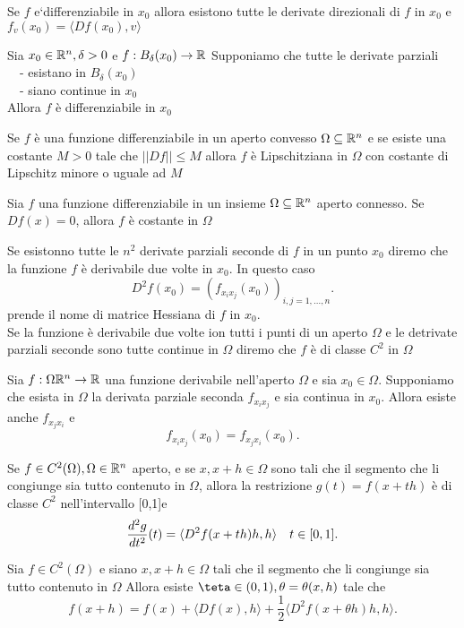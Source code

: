 \documentclass[12px]{article}
\begin{document}
	\begin{teo}
		Se $f$ e`differenziabile in $x_0$ allora esistono tutte le derivate direzionali di $f$ in $x_0$ e $f_v(x_0) = \langle Df(x_0), v \rangle $
	\end{teo}
	\begin{teo}
		Sia $x_0\in \mathbb{R}^n,\delta>0$ e $f:B_{\delta}(x_0) \rightarrow\mathbb{R}$ Supponiamo che tutte le derivate parziali\\
		\text{} \ \ - esistano in $B_\delta(x_0)$ \\
		\text{}	\ \ - siano continue in $x_0$\\
Allora $f$ è differenziabile in $x_0$
	\end{teo}
	\begin{prop}
		Se $f$ è una funzione differenziabile in un aperto convesso $\Omega\subseteq\mathbb{R}^n$ e se esiste una costante  $M>0$ tale che  $||Df||\leq M$ allora  $f$ è Lipschitziana in $\Omega$ con costante di Lipschitz minore o uguale ad $M$
	\end{prop}
	\begin{prop}
		Sia $f$ una funzione differenziabile in un insieme $\Omega\subseteq\mathbb{R}^n$ aperto connesso. Se $Df(x) = 0$, allora $f$ è costante in $\Omega$
	\end{prop}
	\newpage
	\begin{defi}
		Se esistonno tutte le $n^2$ derivate parziali seconde di  $f$ in un punto $x_0$ diremo che la funzione $f$ è derivabile due volte in $x_0$. In questo caso
		\[
			D^2f(x_0) = (f_{x_ix_j}(x_0))_{i,j=1,\ldots,n}
		.\] 
		prende il nome di matrice Hessiana di $f$ in $x_0$.\\
		Se la funzione è derivabile due volte ion tutti i punti di un aperto $\Omega$ e le detrivate parziali seconde sono tutte continue in $\Omega$ diremo che $f$ è di classe $C^2$ in  $\Omega$
	\end{defi}
	\begin{teo}[Schwarz]
		Sia $f:\Omega\mathbb{R}^n \rightarrow \mathbb{R}$ una funzione derivabile nell'aperto $\Omega$ e sia $x_0\in\Omega$. Supponiamo che esista in $\Omega$ la derivata parziale seconda $f_{x_ix_j}$ e sia continua in  $x_0$. Allora esiste anche $f_{x_jx_i}$ e
		\[
			f_{x_ix_j}(x_0)=f_{x_jx_i}(x_0)
		.\] 
	\end{teo}
	\begin{prop}
		Se $f\in C^2(\Omega),\Omega\in\mathbb{R}^n$ aperto, e  se  $x, x + h\in \Omega$ sono tali che il segmento che li congiunge sia tutto contenuto in $\Omega$, allora la restrizione $g(t) = f(x + th)$ è di classe $C^2$ nell'intervallo [0,1]e
		\[
			\frac{d ^2g}{d t^2}(t) = \langle D^2f(x + th)h,h  \rangle  \ \ \ t \in [0,1]
		.\] 
	\end{prop}
	\begin{teo}
	Sia $f\in C^2(\Omega)$ e siano $x,x+h\in\Omega$ tali che il segmento che li congiunge sia tutto contenuto in $\Omega$ Allora esiste $\teta\in(0,1),\theta = \theta(x,h)$ tale che
	\[
	f(x + h) = f(x) + \langle Df(x), h \rangle + \frac 12 \langle D^2f(x + \theta h)h, h \rangle 
	.\] 
	\end{teo}
	\newpage
\end{document}
